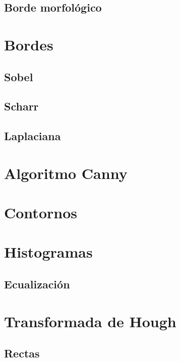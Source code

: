 \subsection{Borde morfológico}

\section{Bordes}
\subsection{Sobel}
\subsection{Scharr}
\subsection{Laplaciana}

\section{Algoritmo Canny}

\section{Contornos}

\section{Histogramas}
\subsection{Ecualización}

\section{Transformada de Hough}
\subsection{Rectas}